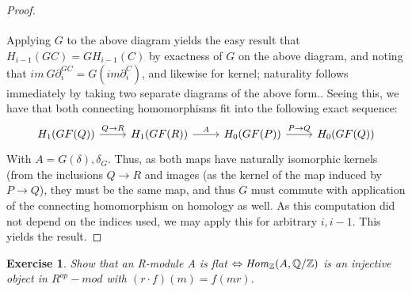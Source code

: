 \documentclass{article}
\newcommand{\bb}[1]{\mathbb{#1}}
\newtheorem{exercise}{Exercise}
\begin{document}
\begin{proof}
\[\begin{tikzcd}
\end{tikzcd}
\]
Applying $G$ to the above diagram yields the easy result that $H_{i-1}(GC) = GH_{i-1}(C)$ by exactness of $G$ on the above diagram, and noting that $im \ G\partial^{GC}_{i} = G(im \partial^{C}_{i})$, and likewise for kernel; naturality follows immediately by taking two separate diagrams of the above form.. Seeing this, we have that both connecting homomorphisms fit into the following exact sequence:
\[
  \begin{tikzcd}
    H_1(GF(Q)) \arrow[r, "Q \to R"] & H_1(GF(R)) \arrow[r, "A"] & H_0(GF(P)) \arrow[r, "P \to Q"] & H_{0}(GF(Q))
  \end{tikzcd}
\]
With $A = G(\delta), \delta_{G}$. Thus, as both maps have naturally isomorphic kernels (from the inclusions $Q \to R$ and images (as the kernel of the map induced by $P \to Q$), they must be the same map, and thus $G$ must commute with application of the connecting homomorphism on homology as well. As this computation did not depend on the indices used, we may apply this for arbitrary $i, i-1$. This yields the result.
\end{proof}
\begin{exercise}
 Show that an R-module A is flat $\Leftrightarrow \text{\emph{Hom}}_{\bb{Z}}(A, \bb{Q}/\bb{Z})$ is an injective object in $R^{op}-mod$ with $(r \cdot f)(m) = f(mr)$.
\end{exercise}
\end{document}
